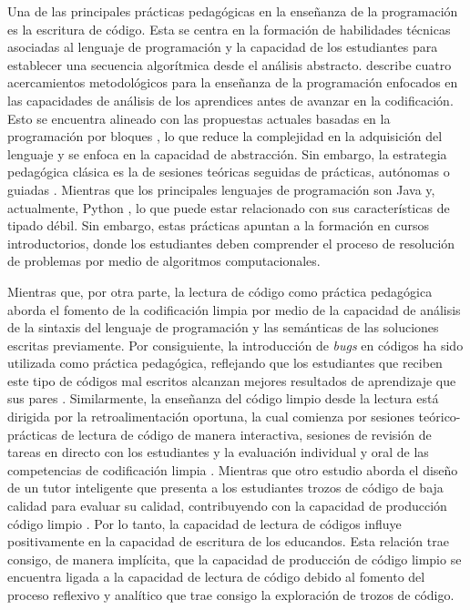 \documentclass[spanish]{textolivre}
\begin{document}
Una de las principales prácticas pedagógicas en la enseñanza de la programación es la escritura de código. Esta se centra en la formación de habilidades técnicas asociadas al lenguaje de programación y la capacidad de los estudiantes para establecer una secuencia algorítmica desde el análisis abstracto. \textcite{fincher1999we} describe cuatro acercamientos metodológicos para la enseñanza de la programación enfocados en las capacidades de análisis de los aprendices antes de avanzar en la codificación. Esto se encuentra alineado con las propuestas actuales basadas en la programación por bloques \cite{kyfonidis2017block, weintrop2019block}, lo que reduce la complejidad en la adquisición del lenguaje y se enfoca en la capacidad de abstracción. Sin embargo, la estrategia pedagógica clásica es la de sesiones teóricas seguidas de prácticas, autónomas o guiadas \cite{murphy2016analysis}. Mientras que los principales lenguajes de programación son Java y, actualmente, Python \cite{becker201950}, lo que puede estar relacionado con sus características de tipado débil. Sin embargo, estas prácticas apuntan a la formación en cursos introductorios, donde los estudiantes deben comprender el proceso de resolución de problemas por medio de algoritmos computacionales.

Mientras que, por otra parte, la lectura de código como práctica pedagógica aborda el fomento de la codificación limpia por medio de la capacidad de análisis de la sintaxis del lenguaje de programación y las semánticas de las soluciones escritas previamente. Por consiguiente, la introducción de \textit{bugs} en códigos ha sido utilizada como práctica pedagógica, reflejando que los estudiantes que reciben este tipo de códigos mal escritos alcanzan mejores resultados de aprendizaje que sus pares \cite{griffin2019designing}. Similarmente, la enseñanza del código limpio desde la lectura está dirigida por la retroalimentación oportuna, la cual comienza por sesiones teórico-prácticas de lectura de código de manera interactiva, sesiones de revisión de tareas en directo con los estudiantes y la evaluación individual y oral de las competencias de codificación limpia \cite{dietz2018teaching}. Mientras que otro estudio aborda el diseño de un tutor inteligente que presenta a los estudiantes trozos de código de baja calidad para evaluar su calidad, contribuyendo con la capacidad de producción código limpio \cite{prokic2021clean}. Por lo tanto, la capacidad de lectura de códigos influye positivamente en la capacidad de escritura de los educandos. Esta relación trae consigo, de manera implícita, que la capacidad de producción de código limpio se encuentra ligada a la capacidad de lectura de código debido al fomento del proceso reflexivo y analítico que trae consigo la exploración de trozos de código.
\end{document}
